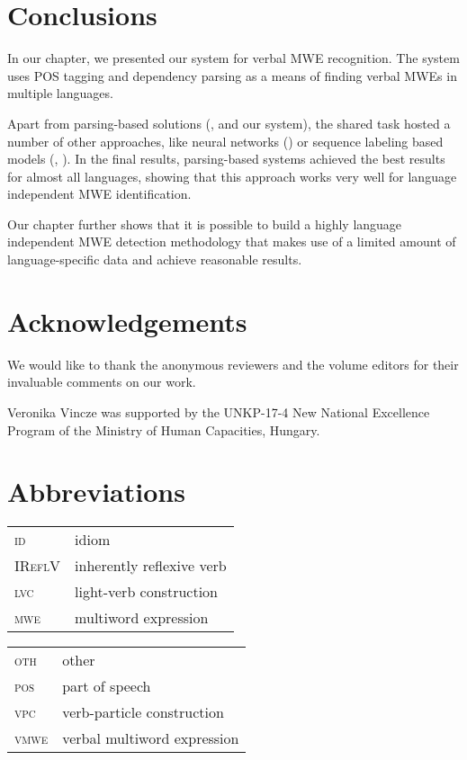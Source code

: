 \documentclass[output=paper,
modfonts,
]{langscibook}
\begin{document}
\section{Conclusions}

In our chapter, we presented our system for verbal MWE recognition. The system uses POS tagging and dependency parsing as a means of finding verbal MWEs in multiple languages.

Apart from parsing-based solutions (\cite{W17-1717}, \cite{W17-1706} and our system), the shared task hosted a number of other approaches, like neural networks (\cite{W17-1707}) or sequence labeling based models (\cite{borocs2017}, \cite{maldonado2017}). In the final results, parsing-based systems achieved the best results for almost all languages, showing that this approach works very well for language independent MWE identification.

Our chapter further shows that it is possible to build a highly language independent MWE detection methodology that makes use of a limited amount of language-specific data and achieve reasonable results. 

\section*{Acknowledgements}

We would like to thank the anonymous reviewers and the volume editors for their invaluable comments on our work.

Veronika Vincze was supported by the UNKP-17-4 New National Excellence Program of the Ministry of Human Capacities, Hungary.

\section*{Abbreviations}
\begin{tabularx}{.48\textwidth}{ll}
\textsc{id} & idiom\\
\textsc{IReflV} & inherently reflexive verb \\
\textsc{lvc} & light-verb construction \\
\textsc{mwe} & multiword expression \\
\end{tabularx}
\begin{tabularx}{.48\textwidth}{ll}
\textsc{oth} & other  \\
\textsc{pos} & part of speech  \\
\textsc{vpc} & verb-particle construction \\
\textsc{vmwe} & verbal multiword expression \\
\end{tabularx}



{\sloppy
\printbibliography[heading=subbibliography,notkeyword=this]
}
\end{document}
